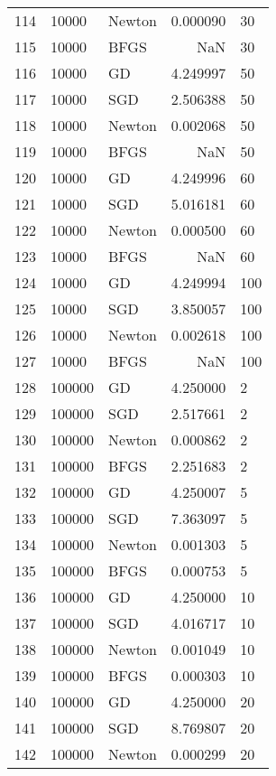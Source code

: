 \begin{tabular}{lllrl}
114 &    10000 &  Newton &    0.000090 &     30 \\
115 &    10000 &    BFGS &         NaN &     30 \\
116 &    10000 &      GD &    4.249997 &     50 \\
117 &    10000 &     SGD &    2.506388 &     50 \\
118 &    10000 &  Newton &    0.002068 &     50 \\
119 &    10000 &    BFGS &         NaN &     50 \\
120 &    10000 &      GD &    4.249996 &     60 \\
121 &    10000 &     SGD &    5.016181 &     60 \\
122 &    10000 &  Newton &    0.000500 &     60 \\
123 &    10000 &    BFGS &         NaN &     60 \\
124 &    10000 &      GD &    4.249994 &    100 \\
125 &    10000 &     SGD &    3.850057 &    100 \\
126 &    10000 &  Newton &    0.002618 &    100 \\
127 &    10000 &    BFGS &         NaN &    100 \\
128 &   100000 &      GD &    4.250000 &      2 \\
129 &   100000 &     SGD &    2.517661 &      2 \\
130 &   100000 &  Newton &    0.000862 &      2 \\
131 &   100000 &    BFGS &    2.251683 &      2 \\
132 &   100000 &      GD &    4.250007 &      5 \\
133 &   100000 &     SGD &    7.363097 &      5 \\
134 &   100000 &  Newton &    0.001303 &      5 \\
135 &   100000 &    BFGS &    0.000753 &      5 \\
136 &   100000 &      GD &    4.250000 &     10 \\
137 &   100000 &     SGD &    4.016717 &     10 \\
138 &   100000 &  Newton &    0.001049 &     10 \\
139 &   100000 &    BFGS &    0.000303 &     10 \\
140 &   100000 &      GD &    4.250000 &     20 \\
141 &   100000 &     SGD &    8.769807 &     20 \\
142 &   100000 &  Newton &    0.000299 &     20 \\

\end{tabular}
